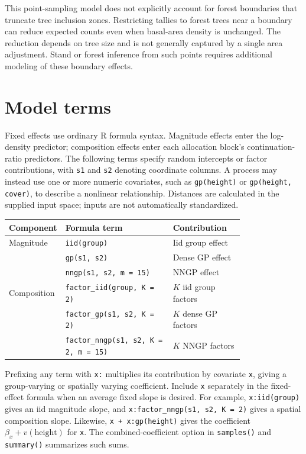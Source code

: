 \documentclass[11pt]{article}
\begin{document}
This point-sampling model does not explicitly account for forest boundaries
that truncate tree inclusion zones. Restricting tallies to forest trees near a
boundary can reduce expected counts even when basal-area density is unchanged.
The reduction depends on tree size and is not generally captured by a single
area adjustment. Stand or forest inference from such points requires additional
modeling of these boundary effects.

\section{Model terms}
\label{sec:model-terms}

Fixed effects use ordinary R formula syntax. Magnitude effects enter the
log-density predictor; composition effects enter each allocation block's
continuation-ratio predictors. The following terms specify random intercepts
or factor contributions, with \texttt{s1} and \texttt{s2} denoting coordinate
columns. A process may instead use one or more numeric covariates, such as
\texttt{gp(height)} or \texttt{gp(height, cover)}, to describe a nonlinear
relationship. Distances are calculated in the supplied input space; inputs
are not automatically standardized.

\begin{center}
\small
\begin{tabular}{@{}lp{0.48\linewidth}p{0.31\linewidth}@{}}
\toprule
Component & Formula term & Contribution \\
\midrule
Magnitude & \texttt{iid(group)} & Iid group effect \\
 & \texttt{gp(s1, s2)} & Dense GP effect \\
 & \texttt{nngp(s1, s2, m = 15)} & NNGP effect \\
Composition & \texttt{factor\_iid(group, K = 2)} & \(K\) iid group factors \\
 & \texttt{factor\_gp(s1, s2, K = 2)} & \(K\) dense GP factors \\
 & \texttt{factor\_nngp(s1, s2, K = 2, m = 15)} & \(K\) NNGP factors \\
\bottomrule
\end{tabular}
\end{center}

Prefixing any term with \texttt{x:} multiplies its contribution by covariate
\texttt{x}, giving a group-varying or spatially varying coefficient. Include
\texttt{x} separately in the fixed-effect formula when an average fixed slope
is desired. For example, \texttt{x:iid(group)} gives an iid magnitude slope,
and \texttt{x:factor\_nngp(s1, s2, K = 2)} gives a spatial composition slope.
Likewise, \texttt{x + x:gp(height)} gives the coefficient
\(\beta_x+v(\mathrm{height})\) for \texttt{x}. The combined-coefficient
option in \texttt{samples()} and \texttt{summary()} summarizes such sums.
\end{document}

